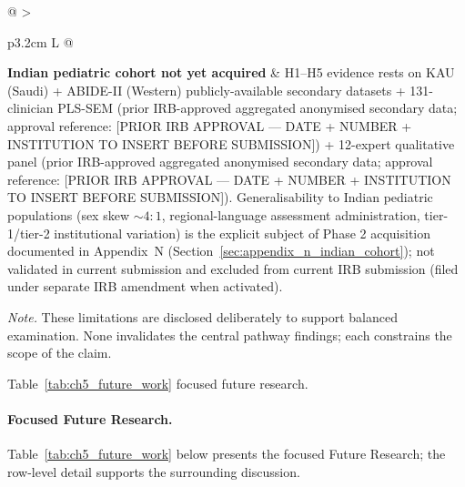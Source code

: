 {\begin{xltabular}{\textwidth}{@{} >{\raggedright\arraybackslash}p{3.2cm} L @{}}
\textbf{Indian pediatric cohort not yet acquired} & H1--H5 evidence rests on KAU (Saudi) + ABIDE-II (Western) publicly-available secondary datasets + 131-clinician PLS-SEM (prior IRB-approved aggregated anonymised secondary data; approval reference: [PRIOR IRB APPROVAL --- DATE + NUMBER + INSTITUTION TO INSERT BEFORE SUBMISSION]) + 12-expert qualitative panel (prior IRB-approved aggregated anonymised secondary data; approval reference: [PRIOR IRB APPROVAL --- DATE + NUMBER + INSTITUTION TO INSERT BEFORE SUBMISSION]). Generalisability to Indian pediatric populations (sex skew $\sim 4:1$, regional-language assessment administration, tier-1/tier-2 institutional variation) is the explicit subject of Phase 2 acquisition documented in Appendix~N (Section~\ref{sec:appendix_n_indian_cohort}); not validated in current submission and excluded from current IRB submission (filed under separate IRB amendment when activated). \\
\end{xltabular}}
\vspace{0.4em}
\noindent\textit{Note.} These limitations are disclosed deliberately to support balanced examination. None invalidates the central pathway findings; each constrains the scope of the claim.

\noindent Table~\ref{tab:ch5_future_work} focused future research.

\paragraph{Focused Future Research.}


\noindent Table~\ref{tab:ch5_future_work} below presents the focused Future Research; the row-level detail supports the surrounding discussion.

